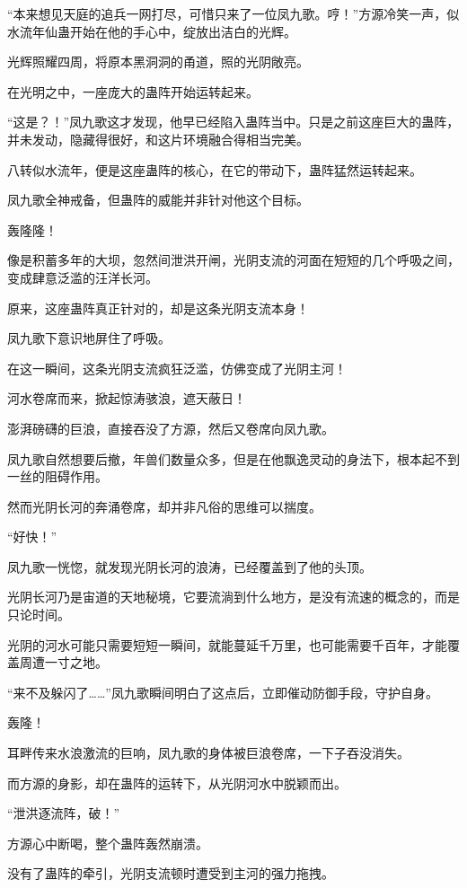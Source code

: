\begin{this_body}
“本来想见天庭的追兵一网打尽，可惜只来了一位凤九歌。哼！”方源冷笑一声，似水流年仙蛊开始在他的手心中，绽放出洁白的光辉。

光辉照耀四周，将原本黑洞洞的甬道，照的光阴敞亮。

在光明之中，一座庞大的蛊阵开始运转起来。

“这是？！”凤九歌这才发现，他早已经陷入蛊阵当中。只是之前这座巨大的蛊阵，并未发动，隐藏得很好，和这片环境融合得相当完美。

八转似水流年，便是这座蛊阵的核心，在它的带动下，蛊阵猛然运转起来。

凤九歌全神戒备，但蛊阵的威能并非针对他这个目标。

轰隆隆！

像是积蓄多年的大坝，忽然间泄洪开闸，光阴支流的河面在短短的几个呼吸之间，变成肆意泛滥的汪洋长河。

原来，这座蛊阵真正针对的，却是这条光阴支流本身！

凤九歌下意识地屏住了呼吸。

在这一瞬间，这条光阴支流疯狂泛滥，仿佛变成了光阴主河！

河水卷席而来，掀起惊涛骇浪，遮天蔽日！

澎湃磅礴的巨浪，直接吞没了方源，然后又卷席向凤九歌。

凤九歌自然想要后撤，年兽们数量众多，但是在他飘逸灵动的身法下，根本起不到一丝的阻碍作用。

然而光阴长河的奔涌卷席，却并非凡俗的思维可以揣度。

“好快！”

凤九歌一恍惚，就发现光阴长河的浪涛，已经覆盖到了他的头顶。

光阴长河乃是宙道的天地秘境，它要流淌到什么地方，是没有流速的概念的，而是只论时间。

光阴的河水可能只需要短短一瞬间，就能蔓延千万里，也可能需要千百年，才能覆盖周遭一寸之地。

“来不及躲闪了……”凤九歌瞬间明白了这点后，立即催动防御手段，守护自身。

轰隆！

耳畔传来水浪激流的巨响，凤九歌的身体被巨浪卷席，一下子吞没消失。

而方源的身影，却在蛊阵的运转下，从光阴河水中脱颖而出。

“泄洪逐流阵，破！”

方源心中断喝，整个蛊阵轰然崩溃。

没有了蛊阵的牵引，光阴支流顿时遭受到主河的强力拖拽。


\end{this_body}
